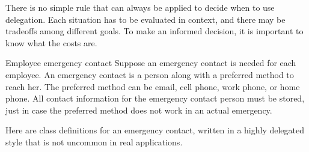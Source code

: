 There is no simple rule that can always be applied to decide when to use delegation. Each situation has to be evaluated in context, and there may be tradeoffs among different goals. To make an informed decision, it is important to know what the costs are.

\begin{example}{Employee emergency contact} 
Suppose an emergency contact is needed for each employee. An emergency contact is a person along with a preferred method to reach her.  The preferred method can be email, cell phone, work phone, or home phone. All contact information for the emergency contact person must be stored, just in case the preferred method does not work in an actual emergency. 
\end{example}

Here are class definitions for an emergency contact, written in a highly delegated style that is not uncommon in real applications. 

